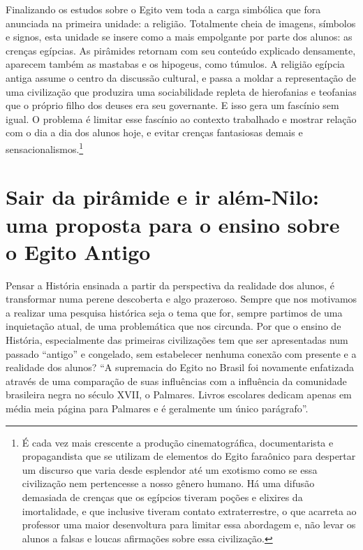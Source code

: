 \begin{refsection}
    Finalizando os estudos sobre o Egito vem toda a carga simbólica que fora anunciada na primeira unidade: a religião. Totalmente cheia de imagens, símbolos e signos, esta unidade se insere como a mais empolgante por parte dos alunos: as crenças egípcias. As pirâmides retornam com seu conteúdo explicado densamente, aparecem também as mastabas e os hipogeus, como túmulos. A religião egípcia antiga assume o centro da discussão cultural, e passa a moldar a representação de uma civilização que produzira uma sociabilidade repleta de hierofanias e teofanias que o próprio filho dos deuses era seu governante. E isso gera um fascínio sem igual. O problema é limitar esse fascínio ao contexto trabalhado e mostrar relação com o dia a dia dos alunos hoje, e evitar crenças fantasiosas demais e sensacionalismos.\footnote{É cada vez mais crescente a produção cinematográfica, documentarista e propagandista que se utilizam de elementos do Egito faraônico para despertar um discurso que varia desde esplendor até um exotismo como se essa civilização nem pertencesse a nosso gênero humano. Há uma difusão demasiada de crenças que os egípcios tiveram poções e elixires da imortalidade, e que inclusive tiveram contato extraterrestre, o que acarreta ao professor uma maior desenvoltura para limitar essa abordagem e, não levar os alunos a falsas e loucas afirmações sobre essa civilização.}

    \section{Sair da pirâmide e ir além-Nilo: uma proposta para o ensino sobre o Egito Antigo}

    Pensar a História ensinada a partir da perspectiva da realidade dos alunos, é transformar numa perene descoberta e algo prazeroso. Sempre que nos motivamos a realizar uma pesquisa histórica seja o tema que for, sempre partimos de uma inquietação atual, de uma problemática que nos circunda. Por que o ensino de História, especialmente das primeiras civilizações tem que ser apresentadas num passado ``antigo'' e congelado, sem estabelecer nenhuma conexão com presente e a realidade dos alunos? ``A supremacia do Egito no Brasil foi novamente enfatizada através de uma comparação de suas influências com a influência da comunidade brasileira negra no século XVII, o Palmares. Livros escolares dedicam apenas em média meia página para Palmares e é geralmente um único parágrafo''. 


\end{refsection}

